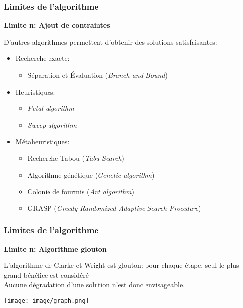 \documentclass[10pt]{beamer}
\begin{document}
	\begin{frame}
		\frametitle{Limites de l'algorithme}
		\begin{center}
			\textbf{Limite n: Ajout de contraintes}
		\end{center}
		D'autres algorithmes permettent d'obtenir des solutions satisfaisantes:
		\begin{itemize}[label=\( \bullet \)]
			\pause%
			\item Recherche exacte:
				\begin{itemize}[label=–]
					\item Séparation et Évaluation (\textit{Branch and Bound})
				\end{itemize}
			\pause%
			\item Heuristiques:
				\begin{itemize}[label=–]
					\item \textit{Petal algorithm}
					\item \textit{Sweep algorithm}
				\end{itemize}
			\pause%
			\item Métaheuristiques:
				\begin{itemize}[label=–]
					\item Recherche Tabou (\textit{Tabu Search})
					\item Algorithme génétique (\textit{Genetic algorithm})
					\item Colonie de fourmis (\textit{Ant algorithm})
					\item GRASP (\textit{Greedy Randomized Adaptive Search Procedure})
				\end{itemize}
		\end{itemize}
	\end{frame}

	\begin{frame}
		\frametitle{Limites de l'algorithme}
		\begin{center}
			\textbf{Limite n: Algorithme glouton}
		\end{center}
		L'algorithme de Clarke et Wright est glouton: pour chaque étape, seul le plus grand bénéfice est considéré \\
		Aucune dégradation d'une solution n'est donc envisageable. \\
		\begin{center}
			\texttt{[image: image/graph.png]}
		\end{center}

	\end{frame}
	
\end{document}
